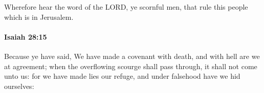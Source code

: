 			Wherefore hear the word of the LORD, ye scornful men, that rule this people which is in Jerusalem.


		\paragraph{Isaiah 28:15} %
			\label{ISAIAH-28-15}

			Because ye have said, We have made a covenant with death, and with hell are we at agreement; when the overflowing scourge shall pass through, it shall not come unto us: for we have made lies our refuge, and under falsehood have we hid ourselves:


